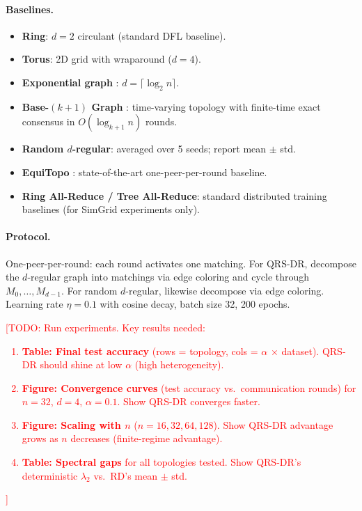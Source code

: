 \documentclass{article}
\newcommand{\lam}{\lambda_2}
\begin{document}
\paragraph{Baselines.}
\begin{itemize}
\item \textbf{Ring}: $d=2$ circulant (standard DFL baseline).
\item \textbf{Torus}: 2D grid with wraparound ($d=4$).
\item \textbf{Exponential graph} \cite{assran2019sgp}: $d = \lceil\log_2 n\rceil$.
\item \textbf{Base-$(k{+}1)$ Graph} \cite{takezawa2023base}: time-varying
    topology with finite-time exact consensus in $O(\log_{k+1} n)$ rounds.
\item \textbf{Random $d$-regular}: averaged over 5 seeds; report mean $\pm$ std.
\item \textbf{EquiTopo} \cite{jin2022equitopo}: state-of-the-art
    one-peer-per-round baseline.
\item \textbf{Ring All-Reduce / Tree All-Reduce}: standard distributed
    training baselines (for SimGrid experiments only).
\end{itemize}

\paragraph{Protocol.}
One-peer-per-round: each round activates one matching.  For QRS-DR,
decompose the $d$-regular graph into matchings via edge coloring and cycle
through $M_0, \ldots, M_{d-1}$.  For random $d$-regular, likewise decompose
via edge coloring.  Learning rate $\eta = 0.1$ with cosine
decay, batch size 32, 200 epochs.

\textcolor{red}{[TODO: Run experiments.  Key results needed:
\begin{enumerate}
\item \textbf{Table: Final test accuracy} (rows = topology, cols = $\alpha$
    $\times$ dataset).  QRS-DR should shine at low $\alpha$ (high heterogeneity).
\item \textbf{Figure: Convergence curves} (test accuracy vs.\ communication
    rounds) for $n=32$, $d=4$, $\alpha=0.1$.  Show QRS-DR converges faster.
\item \textbf{Figure: Scaling with $n$} ($n = 16, 32, 64, 128$).  Show QRS-DR
    advantage grows as $n$ decreases (finite-regime advantage).
\item \textbf{Table: Spectral gaps} for all topologies tested.  Show QRS-DR's
    deterministic $\lam$ vs.\ RD's mean $\pm$ std.
\end{enumerate}]}
\end{document}
